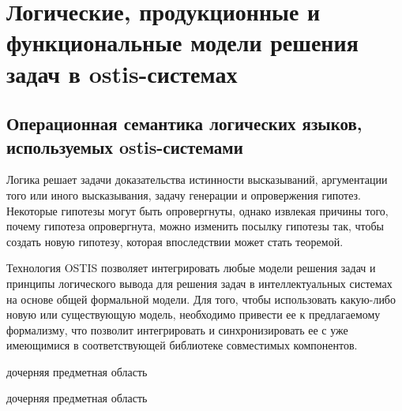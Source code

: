 \chapter{Логические, продукционные и функциональные модели решения задач в ostis-системах}
\label{chapter_logic_productions}


\section{Операционная семантика логических языков, используемых ostis-системами}

Логика решает задачи доказательства истинности высказываний, аргументации того или иного высказывания, задачу генерации и опровержения гипотез. Некоторые гипотезы могут быть опровергнуты, однако извлекая причины того, почему гипотеза опровергнута, можно изменить посылку гипотезы так, чтобы создать новую гипотезу, которая впоследствии может стать теоремой.

Технология OSTIS позволяет интегрировать любые модели решения задач и принципы логического вывода для решения задач в интеллектуальных системах на основе общей формальной модели. Для того, чтобы использовать какую-либо новую или существующую модель, необходимо привести ее к предлагаемому формализму, что позволит интегрировать и синхронизировать ее с уже имеющимися в соответствующей библиотеке совместимых компонентов.

\begin{SCn}
	\begin{scnrelfromlist}{дочерняя предметная область}
	\end{scnrelfromlist}
	
	
	
	\begin{scnreltolist}{дочерняя предметная область}
	\end{scnreltolist}
\end{SCn}

